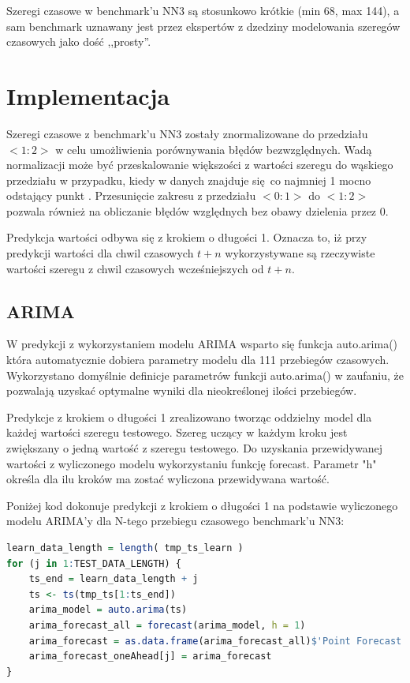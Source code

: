 \documentclass[11pt]{report}
\begin{document}
Szeregi czasowe w benchmark'u NN3 są stosunkowo krótkie (min 68, max 144), a sam benchmark uznawany jest przez ekspertów z dzedziny modelowania szeregów czasowych jako dość ,,prosty''.

\section{Implementacja}

Szeregi czasowe z benchmark'u NN3 zostały znormalizowane do przedziału $<1:2>$ w celu umożliwienia porównywania błędów bezwzględnych.
Wadą normalizacji może być przeskalowanie większości z wartości szeregu do wąskiego przedziału w przypadku, kiedy w danych znajduje się co najmniej 1 mocno odstający punkt \cite{noauthor_standardization_nodate}.
Przesunięcie zakresu z przedziału $<0:1>$ do $<1:2>$ pozwala również na obliczanie błędów względnych bez obawy dzielenia przez 0.

Predykcja wartości odbywa się z krokiem o długości 1.
Oznacza to, iż przy predykcji wartości dla chwil czasowych $t+n$ wykorzystywane są rzeczywiste wartości szeregu z chwil czasowych wcześniejszych od $t+n$.

\subsection{ARIMA}
W predykcji z wykorzystaniem modelu ARIMA wsparto się funkcja auto.arima() która automatycznie dobiera parametry modelu dla 111 przebiegów czasowych.
Wykorzystano domyślnie definicje parametrów funkcji auto.arima() w zaufaniu, że pozwalają uzyskać optymalne wyniki dla nieokreślonej ilości przebiegów.

Predykcje z krokiem o długości 1 zrealizowano tworząc oddzielny model dla każdej wartości szeregu testowego. Szereg uczący w każdym kroku jest zwiększany o jedną wartość z szeregu testowego.
Do uzyskania przewidywanej wartości z wyliczonego modelu wykorzystaniu funkcję forecast. Parametr "h" określa dla ilu kroków ma zostać wyliczona przewidywana wartość.

Poniżej kod dokonuje predykcji z krokiem o długości 1 na podstawie wyliczonego modelu ARIMA'y dla N-tego przebiegu czasowego benchmark'u NN3:
\begin{lstlisting}[language=R]
learn_data_length = length( tmp_ts_learn )
for (j in 1:TEST_DATA_LENGTH) {
    ts_end = learn_data_length + j
    ts <- ts(tmp_ts[1:ts_end])
    arima_model = auto.arima(ts)
    arima_forecast_all = forecast(arima_model, h = 1)
    arima_forecast = as.data.frame(arima_forecast_all)$'Point Forecast'
    arima_forecast_oneAhead[j] = arima_forecast
}
\end{lstlisting}
\end{document}
